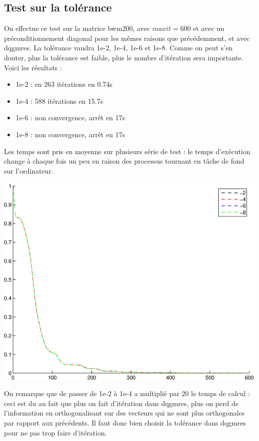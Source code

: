 \subsection{Test sur la tolérance}
On effectue ce test sur la matrice bwm200, avec $maxit=600$ et avec un préconditionnement diagonal pour les mêmes raisons que précédemment, et avec dqgmres. La tolérance vaudra 1e-2, 1e-4, 1e-6 et 1e-8. Comme on peut s'en douter, plus la tolérance est faible, plus le nombre d'itération sera importante. Voici les résultats :
\begin{itemize}
\item 1e-2 : en 263 itérations en 0.74s
\item 1e-4 : 588 itérations en 15.7s
\item 1e-6 : non convergence, arrêt en 17s
\item 1e-8 : non convergence, arrêt en 17s
\end{itemize}
Les temps sont pris en moyenne sur plusieurs série de test : le temps d'exécution change à chaque fois un peu en raison des processus tournant en tâche de fond sur l'ordinateur.
\begin{center}
\includegraphics[scale=0.65]{tol.eps}
\end{center}
On remarque que de passer de 1e-2 à 1e-4 a multiplié par 20 le temps de calcul : ceci est du au fait que plus on fait d'itération dans dqgmres, plus on perd de l'information en orthogonalisant sur des vecteurs qui ne sont plus orthogonales par rapport aux précédents. Il faut donc bien choisir la tolérance dans dqgmres pour ne pas trop faire d'itération. 
